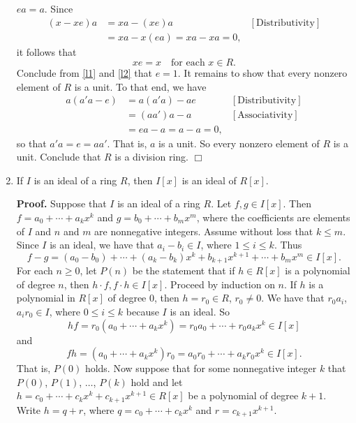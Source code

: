 \documentclass[9pt]{article}
\newcommand{\qed}{\hfill \ensuremath{\Box}}
\begin{document}
\begin{enumerate}
      $ea = a$. Since
      \begin{align*}
         (x - xe)a &= xa - (xe)a &[\text{Distributivity}] \\ 
            &= xa - x(ea) = xa - xa = 0,
      \end{align*}
      it follows that
      \begin{equation} \label{l2}
         xe = x \quad \text{for each } x \in R.
      \end{equation}
      Conclude from \eqref{l1} and \eqref{l2} that $e = 1$. It remains to show
      that every nonzero element of $R$ is a unit. To that end, we have
      \begin{align*}
         a(a'a - e) &= a(a'a) - ae &[\text{Distributivity}] \\ 
            &= (aa')a - a &[\text{Associativity}] \\
            &= ea - a = a - a = 0,
      \end{align*}
      so that $a'a = e = aa'$. That is, $a$ is a unit. So every nonzero element
      of $R$ is a unit. Conclude that $R$ is a division ring. \qed
   \item If $I$ is an ideal of a ring $R$, then $I[x]$ is an ideal of $R[x]$.
         
      \textbf{Proof.} Suppose that $I$ is an ideal of a ring $R$. Let
      $f, g \in I[x]$. Then $f = a_0 + \cdots + a_kx^k$ and
      $g = b_0 + \cdots + b_mx^m$, where the coefficients are elements of $I$
      and $n$ and $m$ are nonnegative integers. Assume without loss that
      $k \le m$. Since $I$ is an ideal, we have that $a_i - b_i \in I$, where
      $1 \le i \le k$. Thus
      $$f - g = (a_0 - b_0) + \cdots + (a_k - b_k)x^k + b_{k + 1}x^{k + 1} +
        \cdots + b_mx^m \in I[x].$$
      For each $n \ge 0$, let $P(n)$ be the statement that if $h \in R[x]$ is 
      a polynomial of degree $n$, then $h \cdot f, f \cdot h \in I[x]$. Proceed
      by induction on $n$. If $h$ is a polynomial in $R[x]$ of degree 0, then
      $h = r_0 \in R$, $r_0 \neq 0$. We have
      that $r_0a_i$, $a_ir_0 \in I$, where $0 \le i \le k$ because $I$ is an
      ideal. So
      $$hf = r_0(a_0 + \cdots + a_kx^k) =  r_0a_0 + \cdots + r_0a_kx^k\in I[x]$$
      and
      $$fh = (a_0 + \cdots + a_kx^k)r_0 =  a_0r_0 + \cdots +a_kr_0x^k\in I[x].$$
      That is, $P(0)$ holds. Now suppose that for some nonnegative integer $k$
      that $P(0)$, $P(1)$, $\ldots$, $P(k)$ hold and let $h = c_0 + \cdots + 
      c_kx^k + c_{k+1}x^{k+1} \in R[x]$ be a polynomial of degree $k + 1$. Write
      $h = q + r$, where $q = c_0 + \cdots + c_kx^k$ and $r = c_{k+1}x^{k+1}$.


\end{enumerate}
\end{document}
